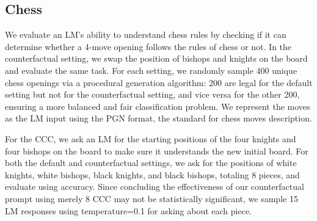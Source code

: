 \subsection{Chess}

We evaluate an LM's ability to understand chess rules by checking if it can determine whether a 4-move opening follows the rules of chess or not.
In the counterfactual setting, we swap the position of bishops and knights on the board and evaluate the same task. For each setting, we randomly sample 400 unique chess openings via a procedural generation algorithm:
200 are legal for the default setting but not for the counterfactual setting, and vice versa for the other 200, ensuring a more balanced and fair classification problem.
We represent the moves as the LM input using the PGN format, the standard for chess moves description.

For the CCC, we ask an LM for the starting positions of the four knights and four bishops on the board to make sure it understands the new initial board. For both the default and counterfactual settings, we ask for the positions of white knights, white bishops, black knights, and black bishops, totaling 8 pieces, and evaluate using accuracy. Since concluding the effectiveness of our counterfactual prompt using merely 8 CCC may not be statistically significant, we sample 15 LM responses using temperature=0.1 for asking about each piece.
